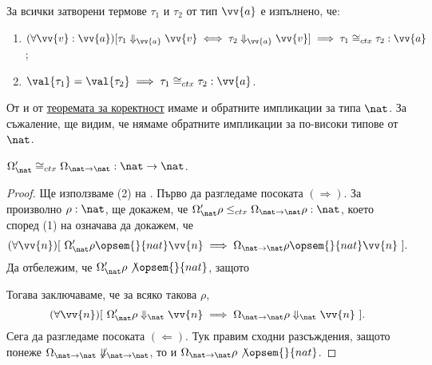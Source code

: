 \begin{framed}
  \begin{theorem}\label{th:pcf:context:connection}
    За всички затворени термове $\tau_1$ и $\tau_2$ от тип $\vv{a}$ е изпълнено, че:
    \begin{enumerate}[(1)]
    \item 
      $(\forall \vv{v}:\vv{a})[\tau_1 \Downarrow_{\vv{a}} \vv{v} \iff \tau_2 \Downarrow_{\vv{a}} \vv{v} ] \implies \tau_1 \cong_{ctx} \tau_2 : \vv{a}$;
    \item
      $\val{\tau_1} = \val{\tau_2} \implies \tau_1 \cong_{ctx} \tau_2 : \vv{a}$.
    \end{enumerate}
  \end{theorem}
\end{framed}

От  и от \hyperref[th:pcf:soundness]{теоремата за коректност} имаме и обратните импликации за типа $\nat$.
За съжаление, ще видим, че нямаме обратните импликации за по-високи типове от $\nat$.


\begin{proposition}\label{pr:context:op-right-left}
  $\Omega'_{\nat} \cong_{ctx} \Omega_{\nat\to\nat} : \nat \to \nat$.
\end{proposition}
\begin{proof}
  Ще използваме (2) на .
  Първо да разгледаме посоката $(\Rightarrow)$. За произволно $\rho:\nat$, ще докажем, че $\Omega'_{\nat}\rho \leq_{ctx} \Omega_{\nat\to\nat}\rho : \nat$,
  което според (1) на  означава да докажем, че
  \[(\forall \vv{n})[\ \Omega'_{\nat}\rho \opsem{}{nat} \vv{n} \implies \Omega_{\nat\to\nat} \rho \opsem{}{nat} \vv{n}\ ].\]
  Да отбележим, че $\Omega'_{\nat} \rho \not\opsem{}{nat}$, защото
  \begin{prooftree}
  \end{prooftree}
  Тогава заключаваме, че за всяко такова $\rho$,
  \[(\forall \vv{n})[\ \Omega'_{\nat}\rho \Downarrow_{\nat} \vv{n} \implies \Omega_{\nat\to\nat} \rho \Downarrow_{\nat} \vv{n}\ ].\]
  Сега да разгледаме посоката $(\Leftarrow)$.
  Тук правим сходни разсъждения, защото понеже $\Omega_{\nat\to\nat} \not\Downarrow_{\nat\to\nat}$, то и $\Omega_{\nat\to\nat} \rho \not\opsem{}{nat}$.
\end{proof}


